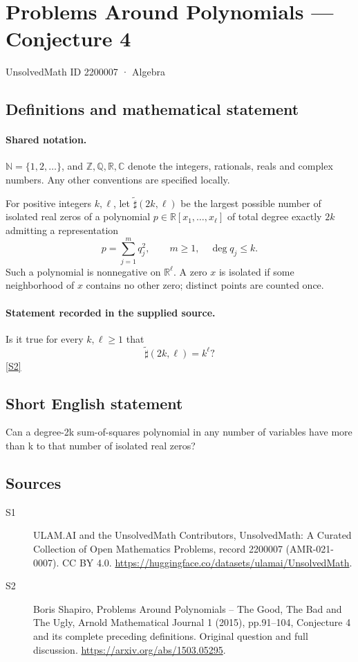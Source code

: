 \documentclass[11pt]{article}
\newcommand{\sref}[2]{\hyperlink{source:#1:#2}{[S#2]}}
\begin{document}
\setcounter{section}{2200006}
\section{Problems Around Polynomials — Conjecture 4}\label{2200007}
{\small\sffamily UnsolvedMath ID 2200007 · Algebra}
\subsection{Definitions and mathematical statement}

\paragraph{Shared notation.}$\mathbb N=\{1,2,\ldots\}$, and $\mathbb Z,\mathbb Q,\mathbb R,\mathbb C$ denote the integers, rationals, reals and complex numbers. Any other conventions are specified locally.


For positive integers $k,\ell$, let $\widetilde\sharp(2k,\ell)$ be the largest possible number of isolated real zeros of a polynomial $p\in\mathbb R[x_1,\ldots,x_\ell]$ of total degree exactly $2k$ admitting a representation
\[p=\sum_{j=1}^m q_j^2,\qquad m\geq1,\quad\deg q_j\leq k.\]
Such a polynomial is nonnegative on $\mathbb R^\ell$. A zero $x$ is isolated if some neighborhood of $x$ contains no other zero; distinct points are counted once.
\paragraph{Statement recorded in the supplied source.}
Is it true for every $k,\ell\geq1$ that
\[\widetilde\sharp(2k,\ell)=k^\ell?\] \sref{2200007}{2}
\subsection{Short English statement}
Can a degree-2k sum-of-squares polynomial in any number of variables have more than k to that number of isolated real zeros?
\subsection{Sources}
\begin{description}
\item[\hypertarget{source:2200007:1}{S1}] ULAM.AI and the UnsolvedMath Contributors, UnsolvedMath: A Curated Collection of Open Mathematics Problems, record 2200007 (AMR-021-0007). CC BY 4.0. \url{https://huggingface.co/datasets/ulamai/UnsolvedMath}.
\item[\hypertarget{source:2200007:2}{S2}] Boris Shapiro, Problems Around Polynomials -- The Good, The Bad and The Ugly, Arnold Mathematical Journal 1 (2015), pp.91--104, Conjecture 4 and its complete preceding definitions. Original question and full discussion. \url{https://arxiv.org/abs/1503.05295}.

\end{description}
\label{end:2200007}
\end{document}
